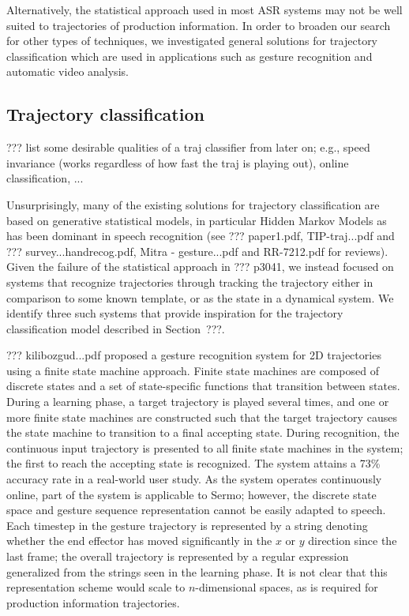 Alternatively, the statistical approach
used in most ASR systems
may not be well suited to
trajectories of production information.
In order to broaden our search
for other types of techniques,
we investigated general solutions
for trajectory classification
which are used in applications
such as gesture recognition
and automatic video analysis.

\subsection{Trajectory classification}

??? list some desirable qualities of a traj classifier
from later on; e.g.,
speed invariance (works regardless of how fast
the traj is playing out),
online classification, ...

Unsurprisingly, many of the existing
solutions for trajectory classification
are based on generative statistical models,
in particular Hidden Markov Models
as has been dominant in speech recognition
(see ??? paper1.pdf, TIP-traj...pdf
and ??? survey...handrecog.pdf,
Mitra - gesture...pdf
and RR-7212.pdf for reviews).
Given the failure of the statistical approach
in ??? p3041,
we instead focused on systems
that recognize trajectories
through tracking the trajectory
either in comparison to some known template,
or as the state in a dynamical system.
We identify three such systems
that provide inspiration
for the trajectory classification model
described in Section~???.

??? kilibozgud...pdf proposed
a gesture recognition system
for 2D trajectories
using a finite state machine approach.
Finite state machines are composed of
discrete states and a set of state-specific
functions that transition between states.
During a learning phase,
a target trajectory is played
several times,
and one or more finite state machines
are constructed such that
the target trajectory
causes the state machine
to transition to a final accepting state.
During recognition,
the continuous input trajectory
is presented to all finite state machines
in the system;
the first to reach the accepting state is recognized.
The system attains a 73\% accuracy rate
in a real-world user study.
As the system operates continuously online,
part of the system is applicable to Sermo;
however, the discrete state space and
gesture sequence representation
cannot be easily adapted to speech.
Each timestep in the gesture trajectory
is represented by a string denoting whether the
end effector has moved significantly
in the $x$ or $y$ direction since the last frame;
the overall trajectory is represented
by a regular expression generalized from
the strings seen in the learning phase.
It is not clear that this representation scheme
would scale to $n$-dimensional spaces,
as is required for production information trajectories.

